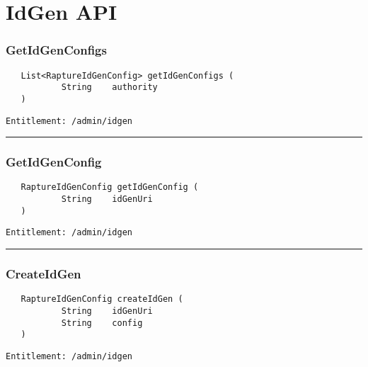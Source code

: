 \chapter{IdGen API}

\subsection{GetIdGenConfigs}
\label{Api:GetIdGenConfigs}
\begin{Verbatim}
   List<RaptureIdGenConfig> getIdGenConfigs (
           String    authority
   )
\end{Verbatim}
\begin{Verbatim}[formatcom=\color{Maroon}]
  Entitlement: /admin/idgen
\end{Verbatim}



\rule{12cm}{2pt}
\subsection{GetIdGenConfig}
\label{Api:GetIdGenConfig}
\begin{Verbatim}
   RaptureIdGenConfig getIdGenConfig (
           String    idGenUri
   )
\end{Verbatim}
\begin{Verbatim}[formatcom=\color{Maroon}]
  Entitlement: /admin/idgen
\end{Verbatim}



\rule{12cm}{2pt}
\subsection{CreateIdGen}
\label{Api:CreateIdGen}
\begin{Verbatim}
   RaptureIdGenConfig createIdGen (
           String    idGenUri
           String    config
   )
\end{Verbatim}
\begin{Verbatim}[formatcom=\color{Maroon}]
  Entitlement: /admin/idgen
\end{Verbatim}



